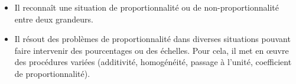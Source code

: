 \begin{prerequis}[Objectifs de 5\up{e}]  
    \begin{itemize}  
        \item Il reconnaît une situation de proportionnalité ou de non-proportionnalité entre deux grandeurs.
        \item Il résout des problèmes de proportionnalité dans diverses situations pouvant faire intervenir des pourcentages ou des échelles. Pour cela, il met en œuvre des procédures variées (additivité, homogénéité, passage à l’unité, coefficient de proportionnalité).
    \end{itemize}
\end{prerequis}
